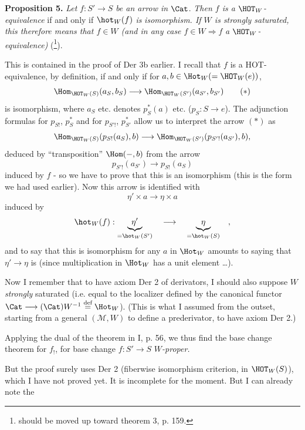 \noindent\textbf{Proposition 5.} \textit{Let} $f : S' \longrightarrow S$ \textit{be an arrow in} $\Cat$. \textit{Then $f$ is a} $\HOT_W$\textit{-equivalence} if and only if $\hot_W(f)$ \textit{is} \textit{isomorphism. If $W$ is strongly saturated, this therefore means that $f \in W$ (and in any case $f \in W \Longrightarrow f$} \textit{a} $\HOT_W$\textit{-equivalence)} (\footnote[81]{should be moved up toward theorem 3, p. 159.}).

This is contained in the proof of Der 3b earlier. I recall that $f$ is a HOT-equivalence, by definition, if and only if for $a, b \in \Hot_W (= \HOT_W(e))$,
\[
\Hom_{\HOT_W(S)}(a_S, b_S) \longrightarrow \Hom_{\HOT_W(S')}(a_{S'}, b_{S'}) \tag*{$(*)$}
\]
is isomorphism, where $a_S$ etc. denotes $p_S^*(a)$ etc. ($p_S : S \longrightarrow e$). The adjunction formulas for $p_{S!}$, $p_S^*$ and for $p_{S'!}$, $p_{S'}^*$ allow us to interpret the arrow $(*)$ as
\[
\Hom_{\HOT_W(S)}(p_{S!}(a_S), b) \longrightarrow \Hom_{\HOT_W(S')}(p_{S'!}(a_{S'}), b),
\]
deduced by ``transposition'' $\Hom(-, b)$ from the arrow
\[
p_{S'!}(a_{S'}) \longrightarrow p_{S!}(a_S)
\]
induced by $f$ - so we have to prove that this is an isomorphism (this is the form we had used earlier). Now this arrow is identified with
\[
\eta' \times a \longrightarrow \eta \times a
\]
induced by
\[
\hot_W(f) : \underbrace{\eta'}_{= \hot_W(S')} \quad \longrightarrow \quad \underbrace{\eta}_{= \hot_W(S)} \quad ,
\]
and to say that this is isomorphism for any $a$ in $\Hot_W$ amounts to saying that $\eta' \longrightarrow \eta$ is (since multiplication in $\Hot_W$ has a unit element \dots). %

Now I remember that to have axiom Der 2 of derivators, I should also suppose $W$ \textit{strongly} saturated (i.e. equal to the localizer defined by the canonical functor $\Cat \longrightarrow (\Cat)W^{-1} \overset{\text{def}}{=} \Hot_W$). (This is what I assumed from the outset, starting from a general $(\mathcal{M}, W)$ to define a prederivator, to have axiom Der 2.)

Applying the dual of the theorem in I, p. 56, we thus find the base change theorem for $f_!$, for base change $f : S' \longrightarrow S$ \textit{$W$-proper.}

\marginpar{$\Vert$}But the proof surely uses Der 2 (fiberwise isomorphism criterion, in $\HOT_W(S)$), which I have not proved yet. It is incomplete for the moment. But I can already note the

